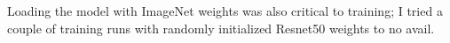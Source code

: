 \documentclass[twocolumn]{article}
\begin{document}
Loading the model with ImageNet weights was also critical to training; I tried a couple of training runs with randomly initialized Resnet50 weights to no avail.















\section*{}
\end{document}
